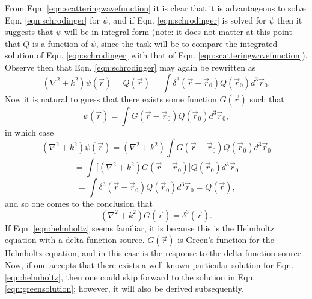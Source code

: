 From Eqn. \ref{eqn:scatteringwavefunction} it is clear that it is advantageous to solve Eqn. \ref{eqn:schrodinger} for $\psi$, and if Eqn. \ref{eqn:schrodinger} is solved for $\psi$ then it suggests that $\psi$ will be in integral form (note: it does not matter at this point that $Q$ is a function of $\psi$, since the task will be to compare the integrated solution of Eqn. \ref{eqn:schrodinger} with that of Eqn. \ref{eqn:scatteringwavefunction}). Observe then that Eqn. \ref{eqn:schrodinger} may again be rewritten as
%
\begin{equation} \nonumber
(\nabla^2+k^2)\psi(\vec{r})=Q (\vec{r}) =\int \delta^3(\vec{r}-\vec{r}_0)Q(\vec{r}_0)d^3\vec{r}_0.
\end{equation}
Now it is natural to guess that there exists some function $G(\vec{r})$ such that
%
\begin{equation}
\label{eqn:psigreen}
\psi(\vec{r})=\int G(\vec{r}-\vec{r}_0)Q(\vec{r}_0)d^3\vec{r}_0,
\end{equation}
in which case
%
\begin{equation} \nonumber
(\nabla^2+k^2)\psi(\vec{r})=(\nabla^2+k^2)\int G(\vec{r}-\vec{r}_0)Q(\vec{r}_0) d^3\vec{r}_0
\end{equation}
\begin{equation} \nonumber
=\int \big[(\nabla^2+k^2)G(\vec{r}-\vec{r}_0)\big]Q(\vec{r}_0) d^3\vec{r}_0
\end{equation}
\begin{equation} \nonumber
=\int\delta^3(\vec{r}-\vec{r}_0)Q(\vec{r}_0)d^3\vec{r}_0=Q(\vec{r}),
\end{equation}
and so one comes to the conclusion that
%
\begin{equation}
\label{eqn:helmholtz}
(\nabla^2+k^2)G(\vec{r})=\delta^3(\vec{r}).
\end{equation}
If Eqn. \ref{eqn:helmholtz} seems familiar, it is because this is the Helmholtz equation with a delta function source. $G(\vec{r})$ is Green's function for the Helmholtz equation, and in this case is the response to the delta function source. Now, if one accepts that there exists a well-known particular solution for Eqn. \ref{eqn:helmholtz}, then one could skip forward to the solution in Eqn. \ref{eqn:greensolution}; however, it will also be derived subsequently.

